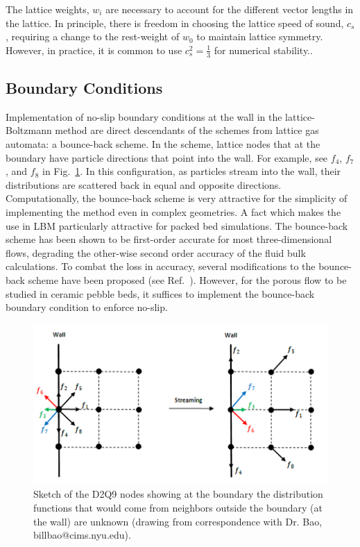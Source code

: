 The lattice weights, $w_i$ are necessary to account for the different vector lengths in the lattice. In principle, there is freedom in choosing the lattice speed of sound, $c_s$, requiring a change to the rest-weight of $w_0$ to maintain lattice symmetry. However, in practice, it is common to use $c_s^2 = \frac{1}{3}$ for numerical stability.\cite{Latt2007,succi2001lattice}.




\subsection{Boundary Conditions}
Implementation of no-slip boundary conditions at the wall in the lattice-Boltzmann method are direct descendants of the schemes from lattice gas automata: a bounce-back scheme. In the scheme, lattice nodes that at the boundary have particle directions that point into the wall. For example, see $f_4$, $f_7$, and $f_8$ in Fig.~\ref{fig:wall-lattice-bc}. In this configuration, as particles stream into the wall, their distributions are scattered back in equal and opposite directions. Computationally, the bounce-back scheme is very attractive for the simplicity of implementing the method even in complex geometries. A fact which makes the use in LBM particularly attractive for packed bed simulations.\cite{Chen1998a} The bounce-back scheme has been shown to be first-order accurate for most three-dimensional flows, degrading the other-wise second order accuracy of the fluid bulk calculations.\cite{Zou1997,Chen1998a} To combat the loss in accuracy, several modifications to the bounce-back scheme have been proposed (see Ref.~\cite{Chen1998a}). However, for the porous flow to be studied in ceramic pebble beds, it suffices to implement the bounce-back boundary condition to enforce no-slip.\cite{Chen1998a,Luo2003a}

\begin{figure}[t]
	\centering
	\includegraphics[width=\singleimagewidth]{chapters/figures/lbm/ongrid}
	\caption{Sketch of the D2Q9 nodes showing at the boundary the distribution functions that would come from neighbors outside the boundary (at the wall) are unknown (drawing from correspondence with Dr. Bao, billbao@cims.nyu.edu).}\label{fig:wall-lattice-bc}
\end{figure}


